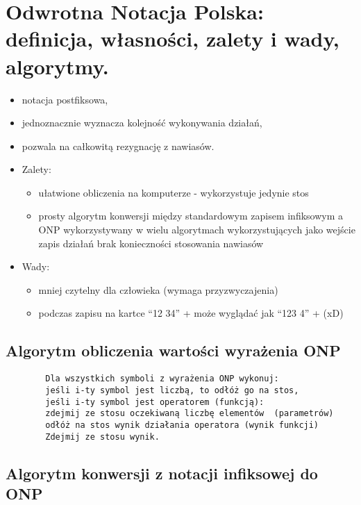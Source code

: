 \documentclass[main.tex]{subfiles}
\begin{document}
    \newpage
    \section{Odwrotna Notacja Polska: definicja, własności, zalety i wady, algorytmy.}

    \begin{itemize}
        \item notacja postfiksowa,
        \item jednoznacznie wyznacza kolejność wykonywania działań,
        \item pozwala na całkowitą rezygnację z nawiasów.
        \item Zalety:
        \begin{itemize}
            \item ułatwione obliczenia na komputerze - wykorzystuje jedynie stos
            \item prosty algorytm konwersji między standardowym zapisem infiksowym a ONP
            wykorzystywany w wielu algorytmach wykorzystujących jako wejście zapis działań
            brak konieczności stosowania nawiasów
        \end{itemize}
        \item Wady:
        \begin{itemize}
            \item mniej czytelny dla człowieka (wymaga przyzwyczajenia)
            \item podczas zapisu na kartce ``12 34'' + może wyglądać jak ``123 4'' + (xD)
        \end{itemize}
    \end{itemize}

    \subsection{Algorytm obliczenia wartości wyrażenia ONP}
    \begin{verbatim}
        Dla wszystkich symboli z wyrażenia ONP wykonuj:
        jeśli i-ty symbol jest liczbą, to odłóż go na stos,
        jeśli i-ty symbol jest operatorem (funkcją):
        zdejmij ze stosu oczekiwaną liczbę elementów  (parametrów)
        odłóż na stos wynik działania operatora (wynik funkcji)
        Zdejmij ze stosu wynik.
    \end{verbatim}

    \subsection{Algorytm konwersji z notacji infiksowej do ONP}
\end{document}

